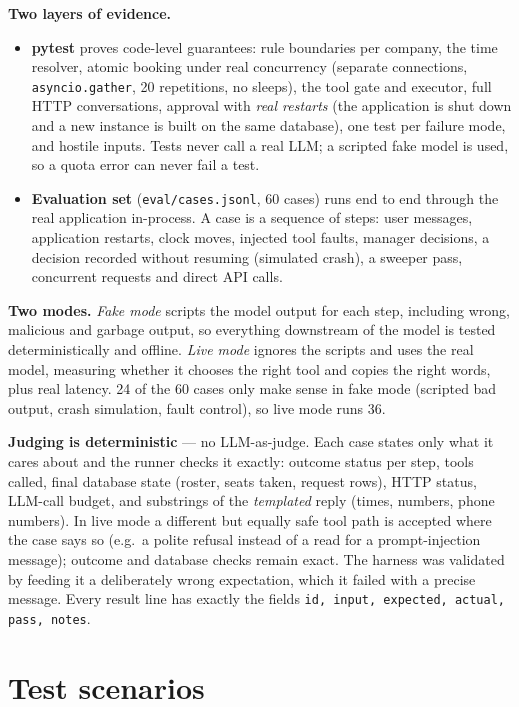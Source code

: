 \documentclass[10.5pt,a4paper]{article}
\begin{document}
\textbf{Two layers of evidence.}
\begin{itemize}
\item \textbf{pytest} proves code-level guarantees: rule boundaries per company, the time resolver, atomic booking
  under real concurrency (separate connections, \texttt{asyncio.gather}, 20 repetitions, no sleeps), the tool gate
  and executor, full HTTP conversations, approval with \emph{real restarts} (the application is shut down and a new
  instance is built on the same database), one test per failure mode, and hostile inputs. Tests never call a real
  LLM; a scripted fake model is used, so a quota error can never fail a test.
\item \textbf{Evaluation set} (\texttt{eval/cases.jsonl}, 60 cases) runs end to end through the real application
  in-process. A case is a sequence of steps: user messages, application restarts, clock moves, injected tool faults,
  manager decisions, a decision recorded without resuming (simulated crash), a sweeper pass, concurrent requests
  and direct API calls.
\end{itemize}

\textbf{Two modes.} \emph{Fake mode} scripts the model output for each step, including wrong, malicious and garbage
output, so everything downstream of the model is tested deterministically and offline. \emph{Live mode} ignores
the scripts and uses the real model, measuring whether it chooses the right tool and copies the right words, plus
real latency. 24 of the 60 cases only make sense in fake mode (scripted bad output, crash simulation, fault control),
so live mode runs 36.

\textbf{Judging is deterministic} --- no LLM-as-judge. Each case states only what it cares about and the runner checks
it exactly: outcome status per step, tools called, final database state (roster, seats taken, request rows),
HTTP status, LLM-call budget, and substrings of the \emph{templated} reply (times, numbers, phone numbers).
In live mode a different but equally safe tool path is accepted where the case says so (e.g.\ a polite refusal
instead of a read for a prompt-injection message); outcome and database checks remain exact.
The harness was validated by feeding it a deliberately wrong expectation, which it failed with a precise message.
Every result line has exactly the fields \texttt{id, input, expected, actual, pass, notes}.

\section{Test scenarios}
\end{document}

